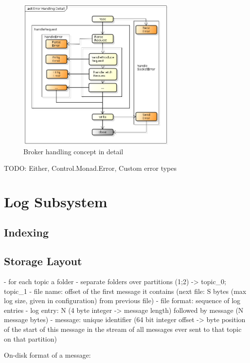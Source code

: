 \begin{figure}[H]
    \centering
    \includegraphics[width=0.7\textwidth]{images/broker-error-activity-detail.png}
    \caption{Broker handling concept in detail}
    \label{fig:broker-error-activity-detail.png}
\end{figure}

TODO: Either, Control.Monad.Error, Custom error types

\section{Log Subsystem}

\subsection{Indexing}

\subsection{Storage Layout}

- for each topic a folder
- separate folders over partitions (1;2) -> topic\_0; topic\_1
- file name: offset of the first message it contains (next file: S bytes (max log size, given in configuration) from previous file)
- file format: sequence of log entries
- log entry: N (4 byte integer -> message length) followed by message (N message bytes)
- message: unique identifier (64 bit integer offset -> byte position of the start of this message in the stream of all messages ever sent to that topic on that partition)

On-disk format of a message:

